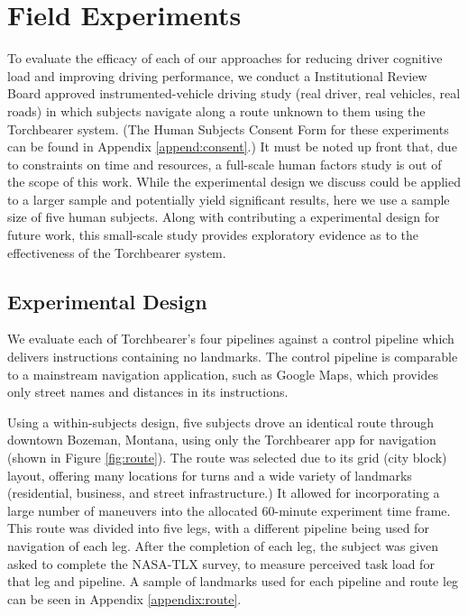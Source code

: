 \fi

\section{Field Experiments}

To evaluate the efficacy of each of our approaches for reducing driver cognitive load and improving driving performance, we conduct a Institutional Review Board approved instrumented-vehicle driving study (real driver, real vehicles, real roads) in which subjects navigate along a route unknown to them using the Torchbearer system. (The Human Subjects Consent Form for these experiments can be found in Appendix \ref{append:consent}.) It must be noted up front that, due to constraints on time and resources, a full-scale human factors study is out of the scope of this work. While the experimental design we discuss could be applied to a larger sample and potentially yield significant results, here we use a sample size of five human subjects. Along with contributing a experimental design for future work, this small-scale study provides exploratory evidence as to the effectiveness of the Torchbearer system.

\subsection{Experimental Design}

We evaluate each of Torchbearer's four pipelines against a control pipeline which delivers instructions containing no landmarks. The control pipeline is comparable to a mainstream navigation application, such as Google Maps, which provides only street names and distances in its instructions.

Using a within-subjects design, five subjects drove an identical route through downtown Bozeman, Montana, using only the Torchbearer app for navigation (shown in Figure \ref{fig:route}). The route was selected due to its grid (city block) layout, offering many locations for turns and a wide variety of landmarks (residential, business, and street infrastructure.) It allowed for incorporating a large number of maneuvers into the allocated 60-minute experiment time frame. This route was divided into five legs, with a different pipeline being used for navigation of each leg. After the completion of each leg, the subject was given asked to complete the NASA-TLX survey, to measure perceived task load for that leg and pipeline. A sample of landmarks used for each pipeline and route leg can be seen in Appendix \ref{appendix:route}.

